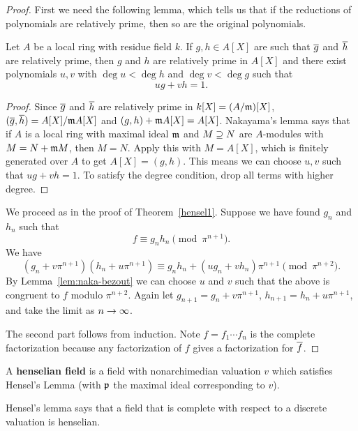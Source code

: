 \begin{proof}
First we need the following lemma, which tells us that if the reductions of polynomials are relatively prime, then so are the original polynomials.
\begin{lem}
Let $A$ be a local ring with residue field $k$. If $g,h\in A[X]$ are such that $\overline{g}$ and $\overline{h}$ are relatively prime, then $g$ and $h$ are relatively prime in $A[X]$ and there exist polynomials $u, v$ with $\deg u<\deg h$ and $\deg v<\deg g$ such that 
\[
ug+vh=1.
\]
\end{lem}
\begin{proof}
Since $\overline{g}$ and $\overline{h}$ are relatively prime in $k[X]=(A/\mathfrak{m})[X]$, $(\overline{g}, \overline{h})=A[X]/\mathfrak{m} A[X]$ and $(g,h)+\mathfrak{m} A[X]=A[X]$. 
Nakayama's lemma says that if $A$ is a local ring with maximal ideal $\mathfrak{m}$ and $M\supseteq N$ are $A$-modules with $M=N+\mathfrak{m} M$, then $M=N$. Apply this with $M=A[X]$, which is finitely generated over $A$ to get $A[X]=(g,h)$. 
This means we can choose $u,v$ such that $ug+vh=1$. To satisfy the degree condition, drop all terms with higher degree.
\end{proof}
We proceed as in the proof of Theorem~\ref{hensel1}. Suppose we have found $g_n$ and $h_n$ such that
\[
f\equiv g_nh_n\pmod{\pi^{n+1}}.
\]
We have
\[
(g_n+v\pi^{n+1})(h_n+u\pi^{n+1})\equiv g_nh_n+(ug_n+vh_n)\pi^{n+1}\pmod{\pi^{n+2}}.
\]
By Lemma~\ref{lem:naka-bezout} we can choose $u$ and $v$ such that the above is congruent to $f$ modulo $\pi^{n+2}$. Again let $g_{n+1}=g_n+v\pi^{n+1}$, $h_{n+1}=h_n+u\pi^{n+1}$, and take the limit as $n\to \infty$.

The second part follows from induction. Note $f=f_1\cdots f_n$ is the complete factorization because any factorization of $f$ gives a factorization for $\overline{f}$.
\end{proof}
\begin{df}
A \textbf{henselian field} is a field with nonarchimedian valuation $v$ which satisfies Hensel's Lemma (with $\mathfrak{p}$ the maximal ideal corresponding to $v$).
\end{df}
Hensel's lemma says that a field that is complete with respect to a discrete valuation is henselian.
